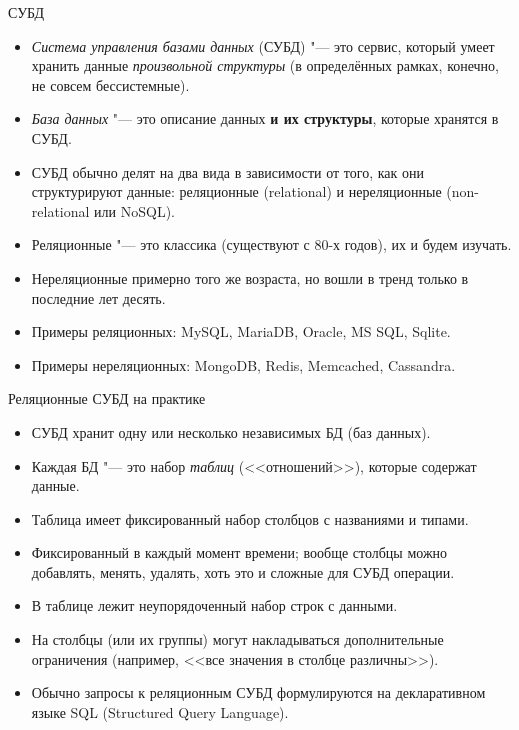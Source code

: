 \begin{frame}[t]{СУБД}
	\begin{itemize}
		\item \textit{Система управления базами данных} (СУБД) "--- это сервис, который умеет хранить данные \textit{произвольной структуры}
			(в определённых рамках, конечно, не совсем бессистемные).
		\item \textit{База данных} "--- это описание данных \textbf{и их структуры}, которые хранятся в СУБД.
		\item СУБД обычно делят на два вида в зависимости от того, как они структурируют данные: реляционные (relational) и нереляционные (non-relational или NoSQL).
		\item Реляционные "--- это классика (существуют с 80-х годов), их и будем изучать.
		\item Нереляционные примерно того же возраста, но вошли в тренд только в последние лет десять.
		\item Примеры реляционных: MySQL, MariaDB, Oracle, MS SQL, Sqlite.
		\item Примеры нереляционных: MongoDB, Redis, Memcached, Cassandra.
	\end{itemize}
\end{frame}

\begin{frame}{Реляционные СУБД на практике}
	\begin{itemize}
		\item СУБД хранит одну или несколько независимых БД (баз данных).
		\item Каждая БД "--- это набор \textit{таблиц} (<<отношений>>), которые содержат данные.
		\item Таблица имеет фиксированный набор столбцов с названиями и типами.
		\item Фиксированный в каждый момент времени; вообще столбцы можно добавлять, менять, удалять, хоть это и сложные для СУБД операции.
		\item В таблице лежит неупорядоченный набор строк с данными.
		\item На столбцы (или их группы) могут накладываться дополнительные ограничения (например, <<все значения в столбце различны>>).
		\item Обычно запросы к реляционным СУБД формулируются на декларативном языке SQL
			(Structured Query Language).
	\end{itemize}
\end{frame}
